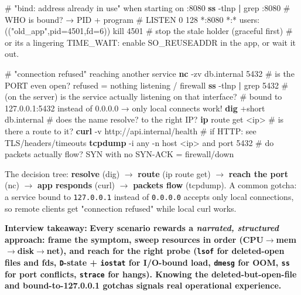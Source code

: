 \documentclass[11pt]{article}
\newenvironment{Shaded}{\begin{snugshade}}{\end{snugshade}}
\newcommand{\AttributeTok}[1]{\textcolor[rgb]{0.16,0.50,0.73}{#1}}
\newcommand{\BuiltInTok}[1]{\textcolor[rgb]{0.50,0.55,0.55}{#1}}
\newcommand{\CommentTok}[1]{\textcolor[rgb]{0.48,0.49,0.49}{#1}}
\newcommand{\ExtensionTok}[1]{\textcolor[rgb]{0.00,0.60,1.00}{\textbf{#1}}}
\newcommand{\FunctionTok}[1]{\textcolor[rgb]{0.56,0.27,0.68}{#1}}
\newcommand{\KeywordTok}[1]{\textcolor[rgb]{0.81,0.81,0.76}{\textbf{#1}}}
\newcommand{\NormalTok}[1]{\textcolor[rgb]{0.81,0.81,0.76}{#1}}
\newcommand{\OperatorTok}[1]{\textcolor[rgb]{0.81,0.81,0.76}{#1}}
\begin{document}

\begin{Shaded}
\begin{Highlighting}[]
\CommentTok{\# "bind: address already in use" when starting on :8080}
\ExtensionTok{ss} \AttributeTok{{-}tlnp} \KeywordTok{|} \FunctionTok{grep}\NormalTok{ :8080          }\CommentTok{\# WHO is bound? → PID + program}
\CommentTok{\#   LISTEN 0 128 *:8080 *:* users:(("old\_app",pid=4501,fd=6))}
\BuiltInTok{kill}\NormalTok{ 4501                      }\CommentTok{\# stop the stale holder (graceful first)}
\CommentTok{\# or it\textquotesingle{}s a lingering TIME\_WAIT: enable SO\_REUSEADDR in the app, or wait it out.}

\CommentTok{\# "connection refused" reaching another service}
\ExtensionTok{nc} \AttributeTok{{-}zv}\NormalTok{ db.internal 5432        }\CommentTok{\# is the PORT even open? refused = nothing listening / firewall}
\ExtensionTok{ss} \AttributeTok{{-}tlnp} \KeywordTok{|} \FunctionTok{grep}\NormalTok{ 5432           }\CommentTok{\# (on the server) is the service actually listening on that interface?}
\CommentTok{\#   bound to 127.0.0.1:5432 instead of 0.0.0.0 → only local connects work!}
\ExtensionTok{dig}\NormalTok{ +short db.internal         }\CommentTok{\# does the name resolve? to the right IP?}
\ExtensionTok{ip}\NormalTok{ route get }\OperatorTok{\textless{}}\NormalTok{ip}\OperatorTok{\textgreater{}}              \CommentTok{\# is there a route to it?}
\ExtensionTok{curl} \AttributeTok{{-}v}\NormalTok{ http://api.internal/health   }\CommentTok{\# if HTTP: see TLS/headers/timeouts}
\ExtensionTok{tcpdump} \AttributeTok{{-}i}\NormalTok{ any }\AttributeTok{{-}n}\NormalTok{ host }\OperatorTok{\textless{}}\NormalTok{ip}\OperatorTok{\textgreater{}}\NormalTok{ and port 5432   }\CommentTok{\# do packets actually flow? SYN with no SYN{-}ACK = firewall/down}
\end{Highlighting}
\end{Shaded}

The decision tree: \textbf{resolve} (dig) \(\rightarrow\) \textbf{route} (ip route get) \(\rightarrow\) \textbf{reach the port} (nc) \(\rightarrow\) \textbf{app responds} (curl) \(\rightarrow\) \textbf{packets flow} (tcpdump). A common gotcha: a service bound to \texttt{127.0.0.1} instead of \texttt{0.0.0.0} accepts only local connections, so remote clients get "connection refused" while local curl works.

\textbf{Interview takeaway:} \textbf{Every scenario rewards a \emph{narrated, structured} approach: frame the symptom, sweep resources in order (CPU\(\rightarrow\)mem\(\rightarrow\)disk\(\rightarrow\)net), and reach for the right probe (\texttt{lsof} for deleted-open files and fds, \texttt{D}-state + \texttt{iostat} for I/O-bound load, \texttt{dmesg} for OOM, \texttt{ss} for port conflicts, \texttt{strace} for hangs). Knowing the deleted-but-open-file and bound-to-127.0.0.1 gotchas signals real operational experience.}
\end{document}

